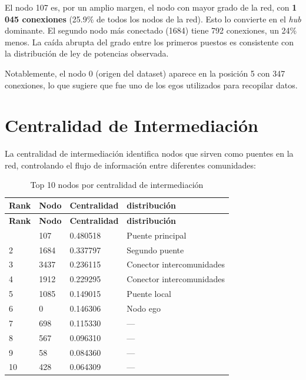 \documentclass[12pt,a4paper,oneside,openany]{book}
\begin{document}
\begin{hallazgobox}
El nodo 107 es, por un amplio margen, el nodo con mayor grado de la red, con
\textbf{1\,045 conexiones} (25.9\% de todos los nodos de la red). Esto lo convierte
en el \textit{hub} dominante. El segundo nodo más conectado (1684) tiene 792
conexiones, un 24\% menos. La caída abrupta del grado entre los primeros puestos
es consistente con la distribución de ley de potencias observada.

Notablemente, el nodo 0 (origen del dataset) aparece en la posición 5 con 347
conexiones, lo que sugiere que fue uno de los egos utilizados para recopilar datos.
\end{hallazgobox}

\section{Centralidad de Intermediación}

La centralidad de intermediación identifica nodos que sirven como puentes en la red,
controlando el flujo de información entre diferentes comunidades:

\begin{xltabular}{\linewidth}{C{1.2cm}C{1.5cm}C{2.5cm}X}
  \caption{Top 10 nodos por centralidad de intermediación}\label{tab:betweenness}\\
  \toprule
  \textbf{Rank} & \textbf{Nodo} & \textbf{Centralidad} & \textbf{distribución} \\
  \midrule
  \endfirsthead
  \toprule
  \textbf{Rank} & \textbf{Nodo} & \textbf{Centralidad} & \textbf{distribución} \\
  \midrule
  \endhead
  \bottomrule
    & 107  & 0.480518 & Puente principal \\
  2  & 1684 & 0.337797 & Segundo puente \\
  3  & 3437 & 0.236115 & Conector intercomunidades \\
  4  & 1912 & 0.229295 & Conector intercomunidades \\
  5  & 1085 & 0.149015 & Puente local \\
  6  & 0    & 0.146306 & Nodo ego \\
  7  & 698  & 0.115330 & --- \\
  8  & 567  & 0.096310 & --- \\
  9  & 58   & 0.084360 & --- \\
  10 & 428  & 0.064309 & --- \\
  \bottomrule
\end{xltabular}
\end{document}
